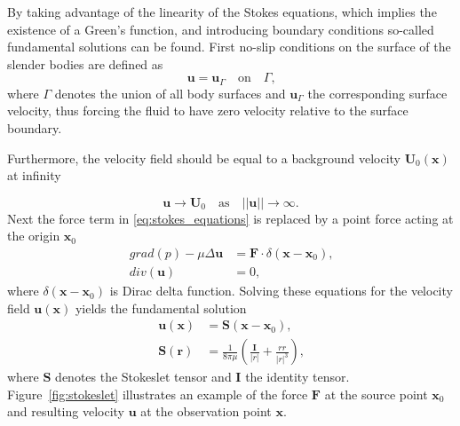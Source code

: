 \documentclass[a4paper,11pt]{kth-mag}
\begin{document}
By taking advantage of the linearity of the Stokes equations, which implies the existence of a Green's function, and introducing boundary conditions so-called fundamental solutions can be found. First no-slip conditions on the surface of the slender bodies are defined as
\begin{equation}
  \label{eq:boundary_condition_surface}
  \mathbf{u} = \mathbf{u}_\Gamma  \quad \text{on} \quad  \Gamma \text{,}
\end{equation}
where $\Gamma$ denotes the union of all body surfaces and $\mathbf{u}_\Gamma$ the corresponding surface velocity, thus forcing the fluid to have zero velocity relative to the surface boundary.

Furthermore, the velocity field should be equal to a background velocity $\mathbf{U}_0(\mathbf{x})$ at infinity

\begin{equation}
  \label{eq:boundary_condition_background}
  \mathbf{u} \rightarrow \mathbf{U}_0 \quad \text{as} \quad ||\mathbf{u}|| \rightarrow \infty \text{.}
\end{equation}
Next the force term in \eqref{eq:stokes_equations} is replaced by a point force acting at the origin $\mathbf{x}_0$
\begin{equation}
  \label{eq:stokes_equations_point}
  \begin{aligned}
    grad(p) - \mu \Delta \mathbf{u} &= \mathbf{F} \cdot \delta(\mathbf{x} - \mathbf{x}_0) \text{,}\\
    div(\mathbf{u}) &= 0 \text{,}
  \end{aligned}
\end{equation}
where $\delta(\mathbf{x} - \mathbf{x}_0)$ is Dirac delta function. Solving these equations for the velocity field $\mathbf{u}(\mathbf{x})$ yields the fundamental solution
\begin{equation}
  \label{eq:stokeslet}
  \begin{aligned}
    \mathbf{u}(\mathbf{x}) &= \mathbf{S}(\mathbf{x}-\mathbf{x}_0) \text{,}\\
    \mathbf{S}(\mathbf{r}) &= \frac{1}{8\pi\mu} \left(\frac{\mathbf{I}}{|r|} + \frac{rr}{|r|^3}\right) \text{,}
  \end{aligned}
\end{equation}
where $\mathbf{S}$ denotes the Stokeslet tensor and $\mathbf{I}$ the identity tensor. Figure~\ref{fig:stokeslet} illustrates an example of the force $\mathbf{F}$ at the source point $\mathbf{x}_0$ and resulting velocity $\mathbf{u}$ at the observation point $\mathbf{x}$.
\end{document}
